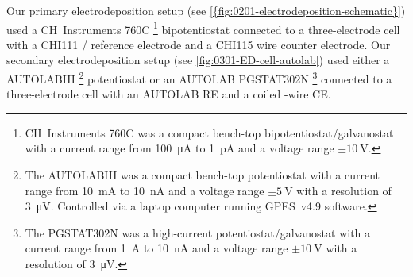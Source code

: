 \documentclass[draft,webedition,openright,titles,swedish,english]{LuaUUThesis}\usepackage[]{graphicx}\usepackage[]{xcolor}
\begin{document}
Our primary electrodeposition setup (see \cref{{fig:0201-electrodeposition-schematic}})
used a CH~Instruments 760C%
\footnote{%
   CH~Instruments 760C was a compact bench-top bipotentiostat/galvanostat
   with a current range from \qty{100}{\micro\ampere} to \qty{1}{\pico\ampere} and a
   voltage range $\pm\qty{10}{\volt}$.
}
bipotentiostat connected to a three-electrode cell with
a CHI111 / reference electrode
and a CHI115  wire counter electrode.
Our secondary electrodeposition setup (see \cref{fig:0301-ED-cell-autolab})
used either a {\textmu}AUTOLABIII%
\footnote{%
   The {\textmu}AUTOLABIII was a compact bench-top potentiostat with
   a current range from \qty{10}{\milli\ampere} to \qty{10}{\nano\ampere} and a
   voltage range $\pm\qty{5}{\volt}$ with a resolution of \qty{3}{\micro\volt}.
   Controlled via a laptop computer running GPES~v4.9 software.
}
potentiostat or an AUTOLAB PGSTAT302N%
\footnote{%
   The PGSTAT302N was a high-current potentiostat/galvanostat with
   a current range from \qty{1}{\ampere} to \qty{10}{\nA} and a
   voltage range $\pm\qty{10}{\volt}$ with a resolution of \qty{3}{\micro\volt}.
}
connected to a three-electrode cell with an AUTOLAB \gls{RE}
and a coiled -wire \gls{CE}.
\end{document}
